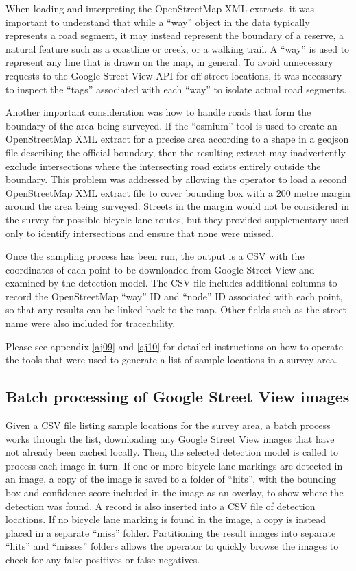 \documentclass[11pt,twoside]{report}
\begin{document}
When loading and interpreting the OpenStreetMap XML extracts, it was important to understand that while a ``way'' object in the data typically represents a road segment, it may instead represent the boundary of a reserve, a natural feature such as a coastline or creek, or a walking trail.  A ``way'' is used to represent any line that is drawn on the map, in general.  To avoid unnecessary requests to the Google Street View API for off-street locations, it was necessary to inspect the ``tags'' associated with each ``way'' to isolate actual road segments.

Another important consideration was how to handle roads that form the boundary of the area being surveyed.  If the ``osmium'' tool is used to create an OpenStreetMap XML extract for a precise area according to a shape in a geojson file describing the official boundary, then the resulting extract may inadvertently exclude intersections where the intersecting road exists entirely outside the boundary.  This problem was addressed by allowing the operator to load a second OpenStreetMap XML extract file to cover bounding box with a 200 metre margin around the area being surveyed.  Streets in the margin would not be considered in the survey for possible bicycle lane routes, but they provided supplementary used only to identify intersections and ensure that none were missed.

Once the sampling process has been run, the output is a CSV with the coordinates of each point to be downloaded from Google Street View and examined by the detection model.  The CSV file includes additional columns to record the OpenStreetMap ``way'' ID and ``node'' ID associated with each point, so that any results can be linked back to the map.  Other fields such as the street name were also included for traceability.

Please see appendix \ref{aj09} and \ref{aj10} for detailed instructions on how to operate the tools that were used to generate a list of sample locations in a survey area.


\subsection{Batch processing of Google Street View images}
\label{s:rq2b}

Given a CSV file listing sample locations for the survey area, a batch process works through the list, downloading any Google Street View images that have not already been cached locally.  Then, the selected detection model is called to process each image in turn.  If one or more bicycle lane markings are detected in an image, a copy of the image is saved to a folder of ``hits'', with the bounding box and confidence score included in the image as an overlay, to show where the detection was found.  A record is also inserted into a CSV file of detection locations.  If no bicycle lane marking is found in the image, a copy is instead placed in a separate ``miss'' folder.  Partitioning the result images into separate  ``hits'' and ``misses'' folders allows the operator to quickly browse the images to check for any false positives or false negatives.
\end{document}
